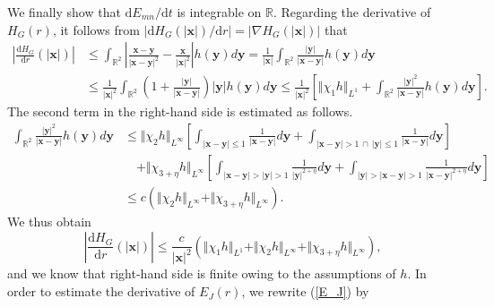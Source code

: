 \documentclass{article}
\theoremstyle{definition}
\begin{document}
We finally show that $\mbox{d}E_{mn}/\mbox{d}t$ is integrable on $\mathbb{R}$. Regarding the derivative of $H_G(r)$, it follows from $ \vert \mbox{d}H_G (\vert{\bm x} \vert)/\mbox{d}r \vert = \vert \nabla H_G(\vert {\bm x} \vert)\vert$ that 
\begin{align*}
\left\vert \frac{\mbox{d}H_G}{\mbox{d}r}(\vert{\bm x}\vert) \right\vert &\leq \int_{\mathbb{R}^2} \left\vert \frac{{\bm x} - {\bm y}}{\vert{\bm x} - {\bm y}\vert^2} - \frac{{\bm x}}{\vert{\bm x}\vert^2} \right\vert h({\bm y}) d{\bm y} = \frac{1}{\vert{\bm x}\vert} \int_{\mathbb{R}^2} \frac{\vert{\bm y}\vert}{\vert{\bm x} - {\bm y}\vert} h({\bm y}) d{\bm y} \\
&\leq \frac{1}{\vert{\bm x}\vert^2} \int_{\mathbb{R}^2} \left( 1 + \frac{\vert{\bm y}\vert}{\vert{\bm x} - {\bm y}\vert} \right) \vert{\bm y}\vert h({\bm y}) d{\bm y} \leq \frac{1}{\vert{\bm x}\vert^2} \left[ \Vert\chi_1 h \Vert_{L^1} + \int_{\mathbb{R}^2} \frac{\vert{\bm y}\vert^2}{\vert{\bm x} - {\bm y}\vert} h({\bm y}) d{\bm y} \right]. 
\end{align*}
The second term in the right-hand side is estimated as follows.
\begin{align*}
\int_{\mathbb{R}^2} \frac{\vert{\bm y}\vert^2}{\vert{\bm x} - {\bm y}\vert} h({\bm y}) d{\bm y} &\leq \Vert \chi_2 h \Vert_{L^\infty} \left[ \int_{\vert{\bm x} - {\bm y}\vert \leq 1} \frac{1}{\vert{\bm x} - {\bm y}\vert} d{\bm y} + \int_{\vert{\bm x} - {\bm y}\vert > 1 \, \cap \, \vert{\bm y}\vert \leq 1} \frac{1}{\vert{\bm x} - {\bm y}\vert} d{\bm y} \right] \\
&\quad  + \Vert \chi_{3 + \eta} h \Vert_{L^\infty} \left[ \int_{\vert{\bm x} - {\bm y}\vert >  \vert{\bm y}\vert > 1} \frac{1}{\vert{\bm y}\vert^{2 + \eta}}  d{\bm y} +  \int_{ \vert{\bm y}\vert > \vert{\bm x} - {\bm y}\vert > 1} \frac{1}{\vert{\bm x} - {\bm y}\vert^{2 + \eta}}  d{\bm y} \right] \\
&\leq c \left( \Vert \chi_2 h \Vert_{L^\infty} +  \Vert \chi_{3 + \eta} h \Vert_{L^\infty} \right).
\end{align*}
We  thus obtain
\begin{equation*}
\left\vert \frac{\mbox{d}H_G}{\mbox{d}r}(\vert{\bm x}\vert) \right\vert \leq \frac{c}{\vert{\bm x}\vert^2} \left( \Vert\chi_1 h \Vert_{L^1} + \Vert \chi_2 h \Vert_{L^\infty} +  \Vert \chi_{3 + \eta} h \Vert_{L^\infty} \right), 
\end{equation*}
and we know that right-hand side is finite owing to the assumptions of $h$. In order to estimate the derivative of $E_J(r)$, we rewrite (\ref{E_J}) by
\end{document}
